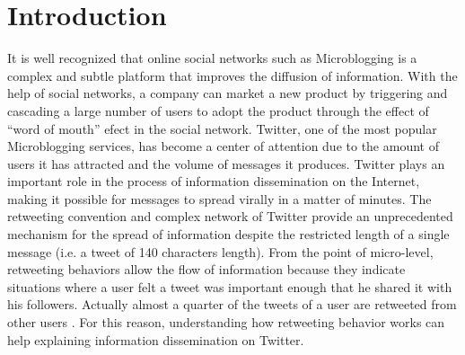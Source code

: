 \documentclass{acm_proc_article-sp}
\begin{document}
\section{Introduction}
\label{introduction}
\noindent It is well recognized that online social networks such as Microblogging is a complex and subtle platform that improves the diffusion of information. With the help of social networks, a company can market a new product by triggering and cascading a large number of users to adopt the product through the effect of ``word of mouth'' efect in the social network. Twitter, one of the most popular Microblogging services, has become a center of attention due to the amount of users it has attracted and the volume of messages it produces. Twitter plays an important role in the process of information dissemination on the Internet, making it possible for messages to spread virally in a matter of minutes. The retweeting convention and complex network of Twitter provide an unprecedented mechanism for the spread of information despite the restricted length of a single message (i.e. a tweet of 140 characters length). From the point of micro-level, retweeting behaviors allow the flow of information because they indicate situations where a user felt a tweet was important enough that he shared it with his followers. Actually almost a quarter of the tweets of a user are retweeted from other users \cite{yang2010understanding}. For this reason, understanding how retweeting behavior works can help explaining information dissemination on Twitter.
\end{document}
